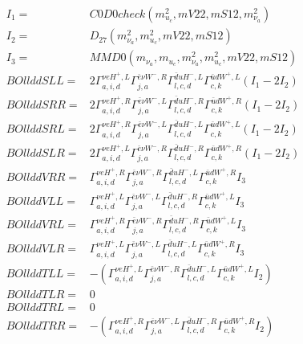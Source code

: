 \documentclass[A4,landscape]{article}
\begin{document}
\begin{align} 
I_1 = & C0D0check(m^2_{u_{{c}}}, mV22, mS12, m^2_{\nu_{{a}}}) \\ 
I_2 = & D_{27}(m^2_{\nu_{{a}}}, m^2_{u_{{c}}}, mV22, mS12) \\ 
I_3 = & MMD0(m_{\nu_{{a}}}, m_{u_{{c}}}, m^2_{\nu_{{a}}}, m^2_{u_{{c}}}, mV22, mS12) \\ 
  BOllddSLL= & 2  \Gamma^{\nu e H^+,L}_{a, i, d} \Gamma^{\bar{e}\nu W^- ,R}_{j, a} \Gamma^{\bar{d}u H^- ,L}_{l, c, d} \Gamma^{\bar{u}d W^+,L}_{c, k} (I_1 - 2 I_2) \\ 
  BOllddSRR= & 2  \Gamma^{\nu e H^+,R}_{a, i, d} \Gamma^{\bar{e}\nu W^- ,L}_{j, a} \Gamma^{\bar{d}u H^- ,R}_{l, c, d} \Gamma^{\bar{u}d W^+,R}_{c, k} (I_1 - 2 I_2) \\ 
  BOllddSRL= & 2  \Gamma^{\nu e H^+,R}_{a, i, d} \Gamma^{\bar{e}\nu W^- ,L}_{j, a} \Gamma^{\bar{d}u H^- ,L}_{l, c, d} \Gamma^{\bar{u}d W^+,L}_{c, k} (I_1 - 2 I_2) \\ 
  BOllddSLR= & 2  \Gamma^{\nu e H^+,L}_{a, i, d} \Gamma^{\bar{e}\nu W^- ,R}_{j, a} \Gamma^{\bar{d}u H^- ,R}_{l, c, d} \Gamma^{\bar{u}d W^+,R}_{c, k} (I_1 - 2 I_2) \\ 
  BOllddVRR= &  \Gamma^{\nu e H^+,R}_{a, i, d} \Gamma^{\bar{e}\nu W^- ,R}_{j, a} \Gamma^{\bar{d}u H^- ,L}_{l, c, d} \Gamma^{\bar{u}d W^+,R}_{c, k} I_3 \\ 
  BOllddVLL= &  \Gamma^{\nu e H^+,L}_{a, i, d} \Gamma^{\bar{e}\nu W^- ,L}_{j, a} \Gamma^{\bar{d}u H^- ,R}_{l, c, d} \Gamma^{\bar{u}d W^+,L}_{c, k} I_3 \\ 
  BOllddVRL= &  \Gamma^{\nu e H^+,R}_{a, i, d} \Gamma^{\bar{e}\nu W^- ,R}_{j, a} \Gamma^{\bar{d}u H^- ,R}_{l, c, d} \Gamma^{\bar{u}d W^+,L}_{c, k} I_3 \\ 
  BOllddVLR= &  \Gamma^{\nu e H^+,L}_{a, i, d} \Gamma^{\bar{e}\nu W^- ,L}_{j, a} \Gamma^{\bar{d}u H^- ,L}_{l, c, d} \Gamma^{\bar{u}d W^+,R}_{c, k} I_3 \\ 
  BOllddTLL= & -( \Gamma^{\nu e H^+,L}_{a, i, d} \Gamma^{\bar{e}\nu W^- ,R}_{j, a} \Gamma^{\bar{d}u H^- ,L}_{l, c, d} \Gamma^{\bar{u}d W^+,L}_{c, k} I_2) \\ 
  BOllddTLR= & 0 \\ 
  BOllddTRL= & 0 \\ 
  BOllddTRR= & -( \Gamma^{\nu e H^+,R}_{a, i, d} \Gamma^{\bar{e}\nu W^- ,L}_{j, a} \Gamma^{\bar{d}u H^- ,R}_{l, c, d} \Gamma^{\bar{u}d W^+,R}_{c, k} I_2) \\ 
\end{align} 
\end{document}
